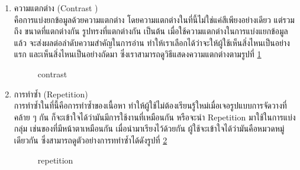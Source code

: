 \documentclass[14pt,oneside,openright,a4paper]{cpe-thai-project}
\begin{document}
  \begin{enumerate}
    \item ความแตกต่าง (Contrast ) \\
    คือการแบ่งยกข้อมูลด้วยความแตกต่าง โดยความแตกต่างในที่นี้ไม่ใช่แค่สีเพียงอย่างเดียว แต่รวมถึง ขนาดที่แตกต่างกัน รูปทรงที่แตกต่างกัน เป็นต้น เมื่อใช้ความแตกต่างในการแบ่งแยกข้อมูลแล้ว จะส่งผลต่อลำดับความสำคัญในการอ่าน ทำให้เราเลือกได้ว่าจะให้ผู้ใช้เห็นสิ่งไหนเป็นอย่างแรก และเห็นสิ่งไหนเป็นอย่างถัดมา ซึ่งเราสามารถดูวิธีแสดงความแตกต่างตามรูปที่ \ref{fig:contrast}
    
    \begin{figure}[!h]\centering
      \setlength{\fboxrule}{0.5mm} %
      \setlength{\fboxsep}{0.5cm}
      \caption{contrast \cite{Contrast}}\label{fig:contrast}
    \end{figure}

    \item การทำซ้ำ (Repetition)\\
    การทำซ้ำในที่นี้คือการทำซ้ำของเนื้อหา ทำให้ผู้ใช้ไม่ต้องเรียนรู้ใหม่เมื่อเจอรูปแบบการจัดวางที่คล้าย ๆ กัน ก็จะเข้าใจได้ว่ามันมีการใช้งานที่เหมือนกัน หรือจะนำ Repetition มาใช้ในการแบ่งกลุ่ม เช่นของที่มีหน้าตาเหมือนกัน เมื่อนำมาเรียงไว้ด้วยกัน ผู้ใช้จะเข้าใจได้ว่ามันคือหมวดหมู่เดียวกัน ซึ่งสามารถดูตัวอย่างการททำซ้ำได้ดังรูปที่ \ref{fig:repietition}
    
    \begin{figure}[!h]\centering
      \setlength{\fboxrule}{0.5mm} %
      \setlength{\fboxsep}{0.5cm}
      \caption{repetition \cite{Repetition}}\label{fig:repietition}
    \end{figure}


\end{enumerate}
\end{document}
